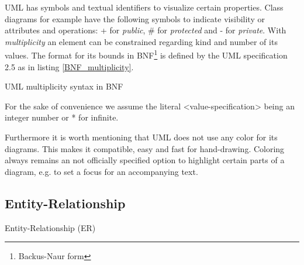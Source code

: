 \documentclass[twoside, openright, 12pt]{book}
\begin{document}
\noindent 
UML has symbols and textual identifiers to visualize certain properties.
Class diagrams for example have the following symbols to indicate visibility or attributes and operations: + for \textit{public}, \# for \textit{protected} and - for \textit{private}.
With \textit{multiplicity} an element can be constrained regarding kind and number of its values.
The format for its bounds in BNF\footnote{Backus-Naur form} is defined by the UML specification 2.5 \citep{UML} as in listing \ref{BNF_multiplicity}.

\setlength{\grammarparsep}{10pt plus 1pt minus 1pt} %
\setlength{\grammarindent}{13em} %

\vspace{0.4cm}
\noindent
\begin{BNF}
\caption{UML multiplicity syntax in BNF}
\label{BNF_multiplicity}
\end{BNF}
\vspace{0.3cm}

\noindent
For the sake of convenience we assume the literal <value-specification> being an integer number or * for infinite.

Furthermore it is worth mentioning that UML does not use any color for its diagrams.
This makes it compatible, easy and fast for hand-drawing.
Coloring always remains an not officially specified option to highlight certain parts of a diagram, e.g. to set a focus for an accompanying text.


\subsection{Entity-Relationship}
\label{ER}
Entity-Relationship (ER)
\end{document}
